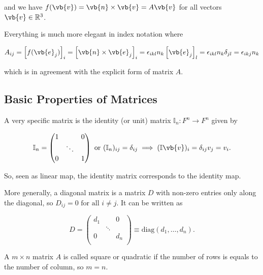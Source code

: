 \documentclass[a4paper,12pt]{report}
\begin{document}
{and we have \(f(\vb{v} ) = \vb{n} \times \vb{v} = A\vb{v} \) for all vectors \(\vb{v} \in \mathbb{R}^3 \). 

Everything is much more elegant in index notation where

\begin{equation}
    A_{ij} = \left[ f(\vb{e} _{j} ) \right]_{i} = \left[ \vb{n} \times \vb{e} _{j}  \right] _{i} = \epsilon _{ikl}n_{k}\left[ \vb{e} _{j}  \right]_{l} = \epsilon _{ikl}n_{k}\delta _{jl}= \epsilon _{ikj}n_{k}       
\end{equation}

which is in agreement with the explicit form of matrix \(A\).} 



\subsection{Basic Properties of Matrices}

A very specific matrix is the identity (or unit) matrix \(\mathbb{I}_{n}: F^{n} \rightarrow  F^{n} \) given by 

\begin{equation}
    \mathbb{I}_{n} = \begin{pmatrix}
        1 &  &  0 \\
         & \ddots  &   \\
        0 &  & 1  \\
    \end{pmatrix} \text { or } (\mathbb{I}_{n} )_{ij} = \delta _{ij} \implies (\mathbb{I}\vb{v} )_{i} = \delta _{ij}v_{j} = v_{i}.
\end{equation}

So, seen as linear map, the identity matrix corresponds to the identity map.

More generally, a diagonal matrix is a matrix \(D\) with non-zero entries only along the diagonal, so \(D_{ij} = 0 \text{ for all } i \neq j \). It can be written as 

\begin{equation}
    D = \begin{pmatrix}
        d_{1}   &  & 0  \\
         & \ddots  &   \\
        0 &  & d_{n}  \\
    \end{pmatrix} \equiv \text{diag}(d_{1} ,\ldots ,d_{n} ). 
\end{equation}

A \(m\times n\) matrix \(A\) is called square or quadratic if the number of rows is equals to the number of column, so \(m = n\). 
\end{document}

